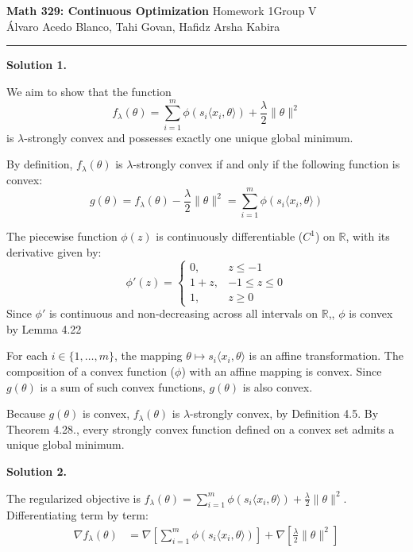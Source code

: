 \documentclass[12pt]{article}
\newcommand{\groupv}{V}
\newcommand{\homework}{1}
\newcommand{\solution}[1]{\vspace{1em}\noindent \textbf{Solution #1.}\par}
\begin{document}
\noindent
\textbf{Math 329: Continuous Optimization} \quad Homework \homework \quad Group \groupv \\
Álvaro Acedo Blanco, Tahi Govan, Hafidz Arsha Kabira

\vspace{1em}
\hrule
\vspace{1em}

\solution{1}

We aim to show that the function
\[
f_\lambda(\theta) = \sum_{i=1}^m \phi(s_i \langle x_i, \theta\rangle) + \frac{\lambda}{2}\|\theta\|^2
\]
is $\lambda$-strongly convex and possesses exactly one unique global minimum.

By definition, $f_\lambda(\theta)$ is $\lambda$-strongly convex if and only if the following function is convex:
\[
g(\theta) = f_\lambda(\theta) - \frac{\lambda}{2}\|\theta\|^2 = \sum_{i=1}^m \phi(s_i \langle x_i, \theta\rangle)
\]

The piecewise function $\phi(z)$ is continuously differentiable ($C^1$) on $\mathbb{R}$, with its derivative given by:
\[
\phi'(z) = 
\begin{cases} 
0, & z \leq -1 \\ 
1 + z, & -1 \leq z \leq 0 \\ 
1, & z \geq 0 
\end{cases}
\]
Since $\phi'$ is continuous and non-decreasing across all intervals on $\mathbb{R}$,, $\phi$ is convex by Lemma 4.22

For each $i \in \{1, \dots, m\}$, the mapping $\theta \mapsto s_i \langle x_i, \theta \rangle$ is an affine transformation. The composition of a convex function ($\phi$) with an affine mapping is convex. Since $g(\theta)$ is a sum of such convex functions, $g(\theta)$ is also convex.

Because $g(\theta)$ is convex, $f_\lambda(\theta)$ is $\lambda$-strongly convex, by Definition 4.5. By Theorem 4.28., every strongly convex function defined on a convex set admits a unique global minimum.

\vspace{2ex}

\solution{2}

The regularized objective is $f_\lambda(\theta) = \sum_{i=1}^m \phi(s_i \langle x_i, \theta\rangle) + \frac{\lambda}{2}\|\theta\|^2$. Differentiating term by term:
\begin{align*}
\nabla f_\lambda(\theta) &= \nabla\left[\sum_{i=1}^m \phi(s_i \langle x_i, \theta\rangle)\right] + \nabla\left[\frac{\lambda}{2}\|\theta\|^2\right]
\end{align*}
\end{document}
